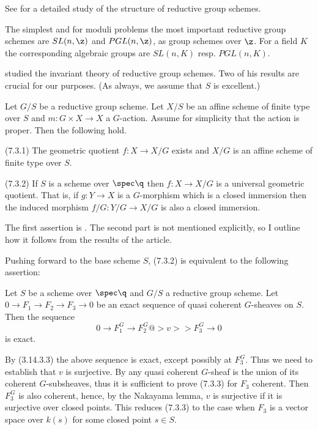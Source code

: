 See \cite{Demazure67} for a detailed study of the structure of reductive group
schemes.
\enddemo

 The simplest and for moduli problems the most important
  reductive group schemes are  $SL(n,\z)$ and  $PGL(n,\z)$, as  group schemes
over $\z$. For a field $K$ the corresponding algebraic groups are $SL(n,K)$
resp. $PGL(n,K)$.
\enddemo

\cite{Seshadri77}  studied the invariant theory of reductive group schemes.
Two of his results are crucial for our purposes. (As always, we assume that
$S$ is excellent.)



 \cite{Seshadri77} Let  $G/S$ be a
reductive group scheme.  Let $X/S$ be an affine scheme of finite type over
$S$ and $m:G\times X\to X$ a $G$-action. Assume for simplicity that the
action is proper. Then the following hold.

(7.3.1) The geometric quotient $f:X\to X/G$  exists and $X/G$ is
an affine scheme of finite type over
$S$.

(7.3.2) If $S$ is a scheme over $\spec \q$ then  $f:X\to X/G$ is a
universal geometric quotient.  That is, if
$g:Y\to X$ is a $G$-morphism which is a
 closed immersion then  the induced morphism  $f/G:Y/G\to X/G$ is  also a
closed immersion.
\endproclaim

\demop  The first assertion is \cite{Seshadri77, p.263}. The second part is
not mentioned explicitly, so I outline how it follows from the results of the
article.

Pushing forward to the base scheme $S$, (7.3.2)  is equivalent to
the following assertion:

  Let $S$ be a scheme over $\spec \q$ and  $G/S$  a
reductive group scheme. Let $0\to
F_1\to F_2\to F_3\to 0$ be an exact sequence of quasi coherent $G$-sheaves on
$S$.  Then the sequence
$$
0\to  F_1^G\to  F_2^G@>v>>  F_3^G\to 0
$$
is exact.
\endproclaim

\demop By (3.14.3.3) the above sequence is exact, except possibly at $F_3^G$.
Thus we need to establish that $v$ is surjective. By
\cite{Seshadri77, p.236} any quasi coherent $G$-sheaf is the union of  its
coherent $G$-subsheaves, thus it is sufficient to prove (7.3.3) for $F_3$
coherent. Then $F_3^G$ is also coherent, hence, by the Nakayama lemma, $v$ is
surjective if it is surjective over closed points. This
reduces (7.3.3) to the case when $F_3$ is a vector space over $k(s)$ for some
closed point $s\in S$.

